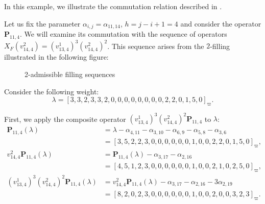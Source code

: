 \begin{example}\rm
In this example, we illustrate the commutation relation described in .

Let us fix the parameter $\alpha_{i,j} = \alpha_{11,14}$, $h = j-i+1 = 4$ and consider the operator $\mathbf{P}_{11,4}$. 
We will examine its commutation with the sequence of operators $X_F(v^{2}_{14,4}) = (v^1_{13,4})^3(v^{2}_{14,4})^2$.
This sequence arises from the $2$-filling illustrated in the following figure:

\begin{figure}[H]
\centering
\def\Cols{2}
\def\Rows{6}
\def\CellFill{gray!50}
\caption{2-admissible filling sequences}
\label{fig: 2-admissible filling sequences}
\end{figure}

Consider the following weight:
\[
    \lambda = [3, 3, 2, 3, 3, 2, 0, 0, 0, 0, 0, 0, 0, 0, 2, 2, 0, 1, 5, 0]_\varpi.
\]

\medskip
\noindent First, we apply the composite operator $(v^1_{13,4})^3(v^{2}_{14,4})^2\mathbf{P}_{11,4}$ to $\lambda$:
\begin{equation}
\begin{aligned}
    \mathbf{P}_{11,4}(\lambda) &= \lambda - \alpha_{4,11} - \alpha_{3,10} - \alpha_{6,9} - \alpha_{5,8} - \alpha_{3,6} \\
    &= [3, 5, 2, 2, 3, 0, 0, 0, 0, 0, 0, 1, 0, 0, 2, 2, 0, 1, 5, 0]_\varpi, \\[5pt]
    v^{2}_{14,4}\mathbf{P}_{11,4}(\lambda) &= \mathbf{P}_{11,4}(\lambda) - \alpha_{3,17}- \alpha_{2,16} \\
    &= [4, 5, 1, 2, 3, 0, 0, 0, 0, 0, 0, 1, 0, 0, 2, 1, 0, 2, 5, 0]_\varpi, \\[5pt]
    (v^1_{13,4})^3(v^{2}_{14,4})^2\mathbf{P}_{11,4}(\lambda) &= v^{2}_{14,4}\mathbf{P}_{11,4}(\lambda) - \alpha_{3,17}- \alpha_{2,16}- 3\alpha_{2,19} \\
    &= [8, 2, 0, 2, 3, 0, 0, 0, 0, 0, 0, 1, 0, 0, 2, 0, 0, 3, 2, 3]_\varpi.
\end{aligned}
\end{equation}


\end{example}
